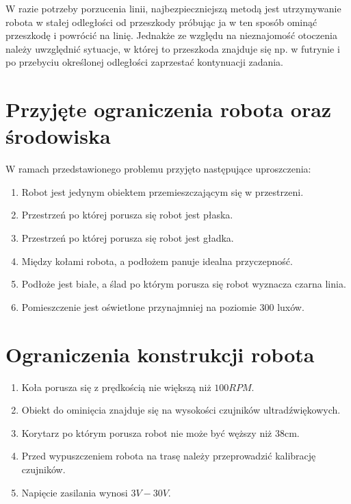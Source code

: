 W razie potrzeby porzucenia linii, najbezpieczniejszą metodą jest utrzymywanie robota w stałej odległości od przeszkody próbując ja w ten sposób ominąć przeszkodę i powrócić na linię. Jednakże ze względu na nieznajomość otoczenia należy uwzględnić sytuacje, w której to przeszkoda znajduje się np. w futrynie i po przebyciu określonej odległości zaprzestać kontynuacji zadania.

\section{Przyjęte ograniczenia robota oraz środowiska}
W ramach przedstawionego problemu przyjęto następujące uproszczenia:
\begin{enumerate}
    \item Robot jest jedynym obiektem przemieszczającym się w przestrzeni.
    \item Przestrzeń po której porusza się robot jest płaska.
    \item Przestrzeń po której porusza się robot jest gładka.
    \item Między kołami robota, a podłożem panuje idealna przyczepność.
    \item Podłoże jest białe, a ślad po którym porusza się robot wyznacza czarna linia.
    \item Pomieszczenie jest oświetlone przynajmniej na poziomie 300 luxów.
\end{enumerate}

\section{Ograniczenia konstrukcji robota}
\begin{enumerate}
    \item Koła porusza się z prędkością nie większą niż $100RPM$.
    \item Obiekt do ominięcia znajduje się na wysokości czujników ultradźwiękowych.
    \item Korytarz po którym porusza robot nie może być węższy niż 38cm.
    \item Przed wypuszczeniem robota na trasę należy przeprowadzić kalibrację czujników.
    \item Napięcie zasilania wynosi $3V-30V$.
\end{enumerate}